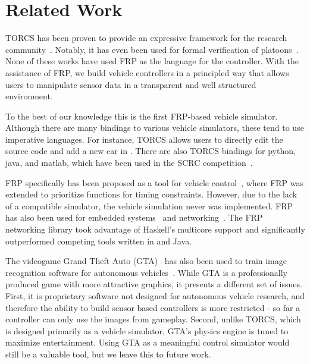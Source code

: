 \section{Related Work}

TORCS has been proven to provide an expressive framework for the research community~\cite{OnievaPAMP09,conf/cig/CardamoneLL09,conf/cig/MunozGS10}. 
Notably, it has even been used for formal verification of platoons~\cite{kamali2016formal,xu2016experimental}. 
None of these works have used FRP as the language for the controller.
With the assistance of FRP, we build vehicle controllers in a principled way that allows users to manipulate sensor data in a transparent and well structured environment.

To the best of our knowledge this is the first FRP-based vehicle simulator.
Although there are many bindings to various vehicle simulators, these tend to use imperative languages.
For instance, TORCS allows users to directly edit the source code and add a new car in \CC.
There are also TORCS bindings for python, java, and matlab, which have been used in the SCRC competition~\cite{SCRC}.

FRP specifically has been proposed as a tool for vehicle control~\cite{kazemi2016,zou2016}, where FRP was extended to prioritize functions for timing constraints. However, due to the lack of a compatible simulator, the vehicle simulation never was implemented. 
FRP has also been used for embedded systems~\cite{helbling2016juniper} and networking~\cite{voellmy2012scalable}.
The FRP networking library took advantage of Haskell's multicore support and significantly outperformed competing tools written in \CC and Java.

The videogame Grand Theft Auto (GTA)~\cite{gtaV} has also been used to train image recognition software for autonomous vehicles~\cite{gtaPrinceton}.
While GTA is a professionally produced game with more attractive graphics, it presents a different set of issues.
First, it is proprietary software not designed for autonomous vehicle research, and therefore the ability to build sensor based controllers is more restricted - so far a controller can only use the images from gameplay. 
Second, unlike TORCS, which is designed primarily as a vehicle simulator, GTA's physics engine is tuned to maximize entertainment.
Using GTA as a meaningful control simulator would still be a valuable tool, but we leave this to future work.
